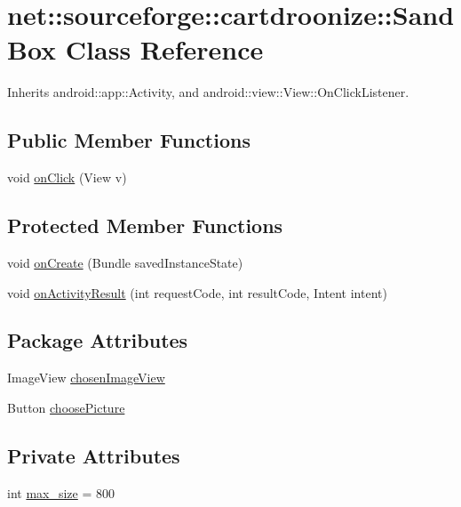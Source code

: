 \hypertarget{classnet_1_1sourceforge_1_1cartdroonize_1_1SandBox}{
\section{net::sourceforge::cartdroonize::SandBox Class Reference}
\label{classnet_1_1sourceforge_1_1cartdroonize_1_1SandBox}
}


Inherits android::app::Activity, and android::view::View::OnClickListener.

\subsection*{Public Member Functions}
\begin{DoxyCompactItemize}
\item 
void \hyperlink{classnet_1_1sourceforge_1_1cartdroonize_1_1SandBox_a30f8490de70a8389ce963411b36ae089}{onClick} (View v)
\end{DoxyCompactItemize}
\subsection*{Protected Member Functions}
\begin{DoxyCompactItemize}
\item 
void \hyperlink{classnet_1_1sourceforge_1_1cartdroonize_1_1SandBox_acd23450f89c5ca9e41e47e70f111702c}{onCreate} (Bundle savedInstanceState)
\item 
void \hyperlink{classnet_1_1sourceforge_1_1cartdroonize_1_1SandBox_abeded53bfc61d6bb59fecf7d4a2ffbee}{onActivityResult} (int requestCode, int resultCode, Intent intent)
\end{DoxyCompactItemize}
\subsection*{Package Attributes}
\begin{DoxyCompactItemize}
\item 
ImageView \hyperlink{classnet_1_1sourceforge_1_1cartdroonize_1_1SandBox_a58aae818b0555a62f51b2e6888c547fe}{chosenImageView}
\item 
Button \hyperlink{classnet_1_1sourceforge_1_1cartdroonize_1_1SandBox_ad18a0605cce8fb6c4169ac1161834b8f}{choosePicture}
\end{DoxyCompactItemize}
\subsection*{Private Attributes}
\begin{DoxyCompactItemize}
\item 
int \hyperlink{classnet_1_1sourceforge_1_1cartdroonize_1_1SandBox_ad86695cd1381d71fbb82d9211d4ae901}{max\_\-size} = 800
\end{DoxyCompactItemize}


